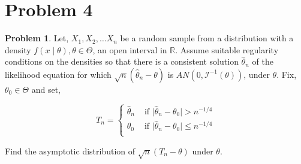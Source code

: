 \documentclass[12pt]{article}
\newcommand{\R}{\mathbb{R}}
\theoremstyle{definition}
\newtheorem*{prb}{Problem}
\newenvironment{problem}{
\begin{tcolorbox}[colback=blue!5!white,colframe=blue!75!black, parbox = true] \begin{prb}  }{\end{prb}\end{tcolorbox} }
\begin{document}
\section{Problem 4}
\begin{problem}
	Let, $X_1, X_2, \dots X_n$ be a random sample from a distribution with a density $f(x \mid \theta), \theta \in \Theta$, an open interval in $\R$. Assume suitable regularity conditions on the densities so that there is a consistent solution $\widehat{\theta}_n$ of the likelihood equation for which $\sqrt{n}(\widehat{\theta}_n - \theta)$ is $AN(0, \mathcal{I}^{-1}(\theta))$, under $\theta$. Fix, $\theta_0 \in \Theta$ and set,
	
	$$T_n = \begin{cases}
		\widehat{\theta}_n & \text{ if } \vert \widehat{\theta}_n - \theta_0 \vert > n^{-1/4}\\
		\theta_0 & \text{ if } \vert \widehat{\theta}_n - \theta_0 \vert \leq n^{-1/4}\\
	\end{cases}$$

	Find the asymptotic distribution of $\sqrt{n}(T_n - \theta)$ under $\theta$. 
\end{problem}
\end{document}
